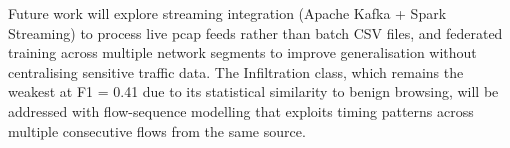 \documentclass[12pt]{article}
\theoremstyle{plain}
\begin{document}
Future work will explore streaming integration (Apache Kafka + Spark Streaming) to process live pcap feeds rather than batch CSV files, and federated training across multiple network segments to improve generalisation without centralising sensitive traffic data. The Infiltration class, which remains the weakest at F1 = 0.41 due to its statistical similarity to benign browsing, will be addressed with flow-sequence modelling that exploits timing patterns across multiple consecutive flows from the same source.

\newpage


\end{document}
